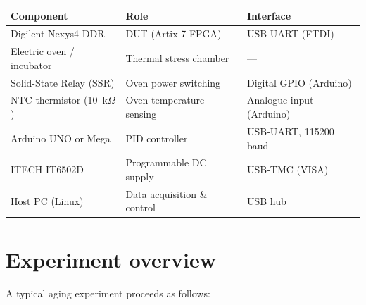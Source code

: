 \documentclass[12pt, a4paper]{report}
\begin{document}
\begin{longtable}{@{}lll@{}}
  \toprule
  \textbf{Component} & \textbf{Role} & \textbf{Interface} \\
  \midrule
  \endhead
  Digilent Nexys4 DDR & DUT (Artix-7 FPGA) & USB-UART (FTDI) \\
  Electric oven / incubator & Thermal stress chamber & --- \\
  Solid-State Relay (SSR) & Oven power switching & Digital GPIO (Arduino) \\
  NTC thermistor (10~k$\Omega$) & Oven temperature sensing & Analogue input (Arduino) \\
  Arduino UNO or Mega & PID controller & USB-UART, 115200 baud \\
  ITECH IT6502D & Programmable DC supply & USB-TMC (VISA) \\
  Host PC (Linux) & Data acquisition \& control & USB hub \\
  \bottomrule
\end{longtable}

\section{Experiment overview}

A typical aging experiment proceeds as follows:
\end{document}
